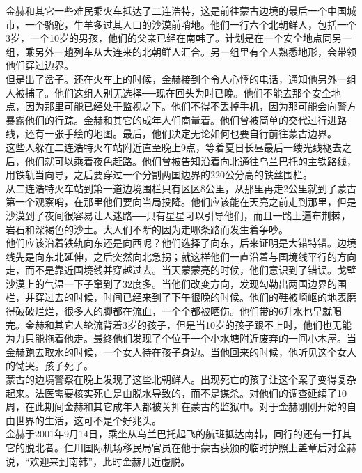 金赫和其它一些难民乘火车抵达了二连浩特，这是前往蒙古边境的最后一个中国城市，一个骆驼，牛羊多过其人口的沙漠前哨地。他们一行六个北朝鲜人，包括一个3岁，一个10岁的男孩，他们的父亲已经在南韩了。计划是在一个安全地点同另一组，乘另外一趟列车从大连来的北朝鲜人汇合。另一组里有个人熟悉地形，会带领他们穿过边界。\\

但是出了岔子。还在火车上的时候，金赫接到个令人心悸的电话，通知他另外一组人被捕了。他们这组人别无选择──现在回头为时已晚。他们不能去那个安全地点，因为那里可能已经处于监视之下。他们不得不丢掉手机，因为那可能会向警方暴露他们的行踪。金赫和其它的成年人们商量着。他们曾被简单的交代过行进路线，还有一张手绘的地图。最后，他们决定无论如何也要自行前往蒙古边界。\\

这些人躲在二连浩特火车站附近直至晚上9点，等着夏日长昼最后一缕光线褪去之后，他们就可以乘着夜色赶路。他们曾被告知沿着向北通往乌兰巴托的主铁路线，用铁轨当向导，之后要穿过一个分割两国边界的220公分高的铁丝围栏。\\

从二连浩特火车站到第一道边境围栏只有区区8公里，从那里再走2公里就到了蒙古第一个观察哨，在那里他们要向当局投降。他们应该能在天亮之前走到那里，但是沙漠到了夜间很容易让人迷路──只有星星可以引导他们，而且一路上遍布荆棘，岩石和深褐色的沙土。大人们不断的因为走哪条路而发生着争吵。\\

他们应该沿着铁轨向东还是向西呢？他们选择了向东，后来证明是大错特错。边境线先是向东北延伸，之后突然向北急拐；就这样他们一直沿着与国境线平行的方向走，而不是靠近国境线并穿越过去。当天蒙蒙亮的时候，他们意识到了错误。戈壁沙漠上的气温一下子窜到了32度多。当他们改变方向，发现勾勒出两国边界的围栏，并穿过去的时候，时间已经来到了下午很晚的时候。他们的鞋被崎岖的地表磨得破破烂烂，很多人的脚都在流血，一个个都被晒伤。他们带的6升水也早就喝完。金赫和其它人轮流背着3岁的孩子，但是当10岁的孩子跟不上时，他们也无能为力只能拖着他走。最终他们发现了个位于一个小水塘附近废弃的一间小木屋。当金赫跑去取水的时候，一个女人待在孩子身边。当他回来的时候，他听见这个女人的恸哭。孩子死了。\\

蒙古的边境警察在晚上发现了这些北朝鲜人。出现死亡的孩子让这个案子变得复杂起来。法医需要核实死亡是由脱水导致的，而不是谋杀。对他们的调查延续了10周，在此期间金赫和其它成年人都被关押在蒙古的监狱中。对于金赫刚刚开始的自由世界的生活，这可不是个好兆头。\\

金赫于2001年9月14日，乘坐从乌兰巴托起飞的航班抵达南韩，同行的还有一打其它的脱北者。仁川国际机场移民局官员在他于蒙古获颁的临时护照上盖章后对金赫说，“欢迎来到南韩”，此时金赫几近虚脱。\\

